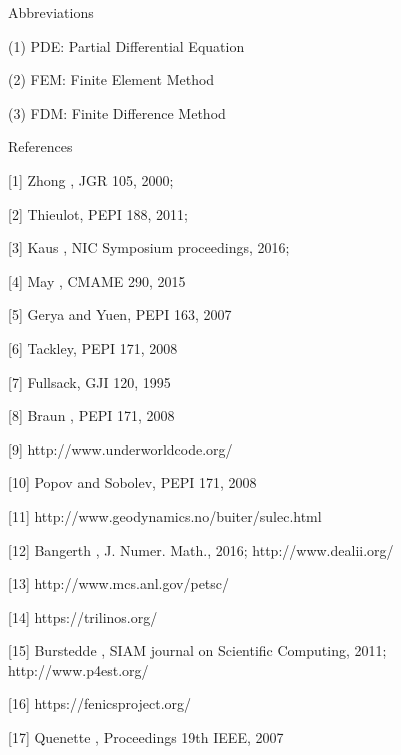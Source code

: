 \vspace{3mm}

\noindent Abbreviations

(1) PDE: Partial Differential Equation 

(2) FEM: Finite Element Method 

(3) FDM: Finite Difference Method

\noindent References

[1] Zhong \etal, JGR 105, 2000; 

[2] Thieulot, PEPI 188, 2011; 

[3] Kaus \etal, NIC Symposium proceedings, 2016; 

[4] May \etal, CMAME 290, 2015 

[5] Gerya and Yuen, PEPI 163, 2007 

[6] Tackley, PEPI 171, 2008 

[7] Fullsack, GJI 120, 1995 

[8] Braun \etal, PEPI 171, 2008 

[9] http://www.underworldcode.org/ 

[10] Popov and Sobolev, PEPI 171, 2008 

[11] http://www.geodynamics.no/buiter/sulec.html 

[12] Bangerth \etal, J. Numer. Math., 2016; http://www.dealii.org/ 

[13] http://www.mcs.anl.gov/petsc/ 

[14] https://trilinos.org/ 

[15] Burstedde \etal, SIAM journal on Scientific Computing, 2011; http://www.p4est.org/ 

[16] https://fenicsproject.org/ 

[17] Quenette \etal, Proceedings 19th IEEE, 2007





